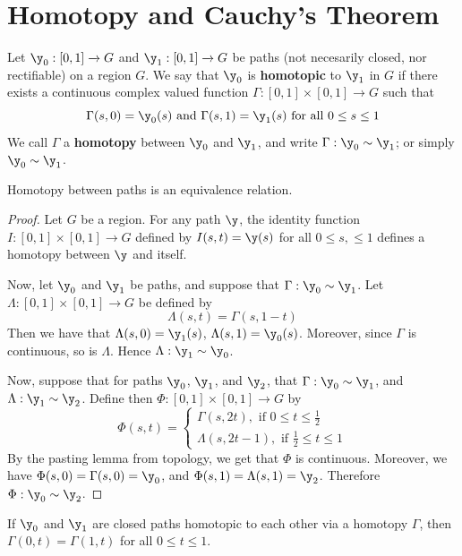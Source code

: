 \section{Homotopy and Cauchy's Theorem}

\begin{definition}
    Let $\y_0:[0,1] \xrightarrow{} G$ and $\y_1:[0,1] \xrightarrow{} G$ be
    paths (not necesarily closed, nor rectifiable) on a region $G$. We say that
    $\y_0$ is \textbf{homotopic}
    to $\y_1$ in $G$ if there exists a continuous complex valued function
    $\Gamma:[0,1] \times [0,1] \xrightarrow{} G$ such that
    \begin{equation*}
        \Gamma(s,0)=\y_0(s) \text{ and } \Gamma(s,1)=\y_1(s) \text{ for all } 0
        \leq s \leq 1
    \end{equation*}
    We call $\Gamma$ a  \textbf{homotopy} between $\y_0$ and $\y_1$, and write
    $\Gamma:\y_0 \sim \y_1$; or simply $\y_0 \sim \y_1$.
\end{definition}

\begin{lemma}\label{4.6.1}
    Homotopy between paths is an equivalence relation.
\end{lemma}
\begin{proof}
    Let $G$ be a region. For any path $\y$, the identity function $I:[0,1] \times
    [0,1]  \xrightarrow{} G$ defined by  $I(s,t)=\y(s)$ for all $0 \leq s, \leq 1$
    defines a homotopy between $\y$ and itself.

    Now, let $\y_0$ and $\y_1$ be paths, and suppose that $\Gamma:\y_0 \sim \y_1$.
    Let $\Lambda:[0,1] \times [0,1] \xrightarrow{} G$ be defined by
    \begin{equation*}
        \Lambda(s,t)=\Gamma(s,1-t)
    \end{equation*}
    Then we have that $\Lambda(s,0)=\y_1(s)$, $\Lambda(s,1)=\y_0(s)$. Moreover,
    since $\Gamma$ is continuous, so is $\Lambda$. Hence  $\Lambda: \y_1 \sim \y_0$.

    Now, suppose that for paths $\y_0$, $\y_1$, and $\y_2$, that $\Gamma: \y_0
    \sim \y_1$, and $\Lambda:\y_1 \sim \y_2$. Define then $\Phi:[0,1] \times [0,1]
    \xrightarrow{} G$ by
    \begin{equation*}
        \Phi(s,t)=\begin{cases}
            \Gamma(s,2t), \text{ if } 0 \leq t \leq \frac{1}{2} \\
            \Lambda(s,2t-1), \text{ if } \frac{1}{2} \leq t \leq 1
        \end{cases}
    \end{equation*}
    By the pasting lemma from topology, we get that $\Phi$ is continuous.
    Moreover, we have $\Phi(s,0)=\Gamma(s,0)=\y_0$, and
    $\Phi(s,1)=\Lambda(s,1)=\y_2$. Therefore  $\Phi: \y_0 \sim \y_2$.
\end{proof}
\begin{corollary}
    If $\y_0$ and $\y_1$ are closed paths homotopic to each other via a homotopy
    $\Gamma$, then  $\Gamma(0,t)=\Gamma(1,t)$ for all $0 \leq t \leq 1$.
\end{corollary}

